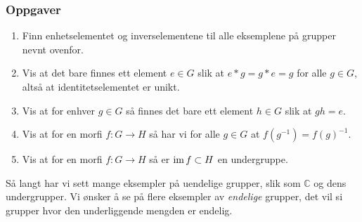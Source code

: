 \subsubsection*{Oppgaver}
\begin{enumerate}
    \item Finn enhetselementet og inverselementene til alle eksemplene på
        grupper nevnt ovenfor.
    \item Vis at det bare finnes ett element $e\in G$ slik
        at $e \ast g = g\ast e = g$ for alle $g\in G$,
        altså at identitetselementet er unikt.
    \item Vis at for enhver $g\in G$ så finnes det bare ett element
        $h\in G$ slik at $gh = e$.
    \item Vis at for en morfi $f\colon G\to H$
        så har vi for alle $g\in G$ at $f(g^{-1}) = {f(g)}^{-1}$.
    \item Vis at for en morfi $f\colon G\to H$ så er $\operatorname{im} f\subset H$ en undergruppe.
\end{enumerate}
Så langt har vi sett mange eksempler på uendelige grupper,
slik som $\mathbb C$ og dens undergrupper.
Vi ønsker å se på flere eksempler av \textit{endelige} grupper,
det vil si grupper hvor den underliggende mengden er endelig.
